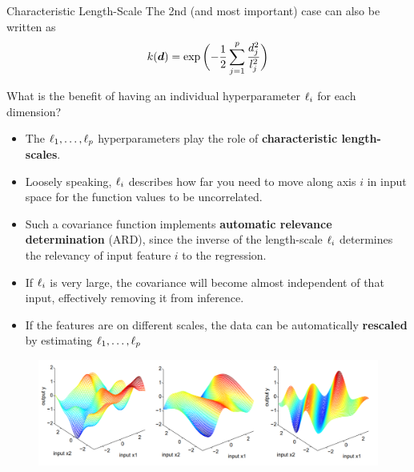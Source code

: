 \documentclass[11pt,compress,t,notes=noshow, xcolor=table]{beamer}
\begin{document}
\begin{frame}[c,allowframebreaks]{Characteristic Length-Scale}
The 2nd (and most important) case can also be written as 
$$
  k(\bm{d}) = \exp\,\biggl(- \frac{1}{2} \sum\limits_{j=1}^p \frac{d_j^2}{l_j^2} \biggr)
$$



\framebreak


What is the benefit of having an individual hyperparameter $\ell_i$ for each dimension?

\vspace{4mm}

\begin{itemize} 
\item The $\ell_1,\dots, \ell_p$ hyperparameters play the role of \textbf{characteristic length-scales}.
\vspace{2mm}
\item Loosely speaking, $\ell_i$ describes how far you need to move along axis $i$ in input space for the function values to be uncorrelated.
\vspace{2mm}
\item Such a covariance function implements \textbf{automatic relevance determination} (ARD), since the inverse of the length-scale $\ell_i$ determines the relevancy of input feature $i$ to the regression.
\vspace{2mm}
\item If $\ell_i$ is very large, the covariance will become almost independent of that input, effectively removing it from inference.
\vspace{2mm}
\item If the features are on different scales, the data can be automatically \textbf{rescaled} by estimating $\ell_1,\dots, \ell_p$ 

\end{itemize}



\framebreak


\begin{figure}
	\includegraphics[width = .8\textwidth]{figure_man/covariance2D.png}
\end{figure}


\end{frame}
\end{document}
